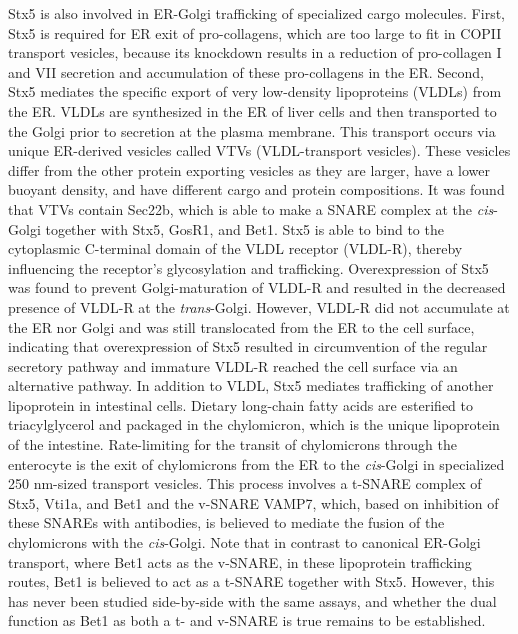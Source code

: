 Stx5 is also involved in ER-Golgi trafficking of specialized cargo molecules. First, Stx5 is required for ER exit of pro-collagens, which are too large to fit in COPII transport vesicles, because its knockdown results in a reduction of pro-collagen I and VII secretion and accumulation of these pro-collagens in the ER\cite{nogueira_sly1_2014}. Second, Stx5 mediates the specific export of very low-density lipoproteins (VLDLs) from the ER. VLDLs are synthesized in the ER of liver cells and then transported to the Golgi prior to secretion at the plasma membrane. This transport occurs via unique ER-derived vesicles called VTVs (VLDL-transport vesicles)\cite{siddiqi_vldl_2008}. These vesicles differ from the other protein exporting vesicles as they are larger, have a lower buoyant density, and have different cargo and protein compositions\cite{siddiqi_vldl_2008}. It was found that VTVs contain Sec22b, which is able to make a SNARE complex at the \emph{cis}-Golgi together with Stx5, GosR1, and Bet1\cite{siddiqi_identification_2010}. Stx5 is able to bind to the cytoplasmic C-terminal domain of the VLDL receptor (VLDL-R), thereby influencing the receptor’s glycosylation and trafficking\cite{wagner_stx5_2013}. Overexpression of Stx5 was found to prevent Golgi-maturation of VLDL-R and resulted in the decreased presence of VLDL-R at the \emph{trans}-Golgi\cite{wagner_stx5_2013}. However, VLDL-R did not accumulate at the ER nor Golgi and was still translocated from the ER to the cell surface, indicating that overexpression of Stx5 resulted in circumvention of the regular secretory pathway and immature VLDL-R reached the cell surface via an alternative pathway\cite{wagner_stx5_2013}. In addition to VLDL, Stx5 mediates trafficking of another lipoprotein in intestinal cells. Dietary long-chain fatty acids are esterified to triacylglycerol and packaged in the chylomicron, which is the unique lipoprotein of the intestine. Rate-limiting for the transit of chylomicrons through the enterocyte is the exit of chylomicrons from the ER to the \emph{cis}-Golgi in specialized 250 nm-sized transport vesicles. This process involves a t-SNARE complex of Stx5, Vti1a, and Bet1 and the v-SNARE VAMP7, which, based on inhibition of these SNAREs with antibodies, is believed to mediate the fusion of the chylomicrons with the \emph{cis}-Golgi\cite{siddiqi_identification_2006}. Note that in contrast to canonical ER-Golgi transport, where Bet1 acts as the v-SNARE\cite{malsam_organization_2011,zhang_mammalian_1997,xu_gs15_2002,volchuk_countercurrent_2004,tai_participation_2004}, in these lipoprotein trafficking routes, Bet1 is believed to act as a t-SNARE together with Stx5. However, this has never been studied side-by-side with the same assays, and whether the dual function as Bet1 as both a t- and v-SNARE is true remains to be established.



